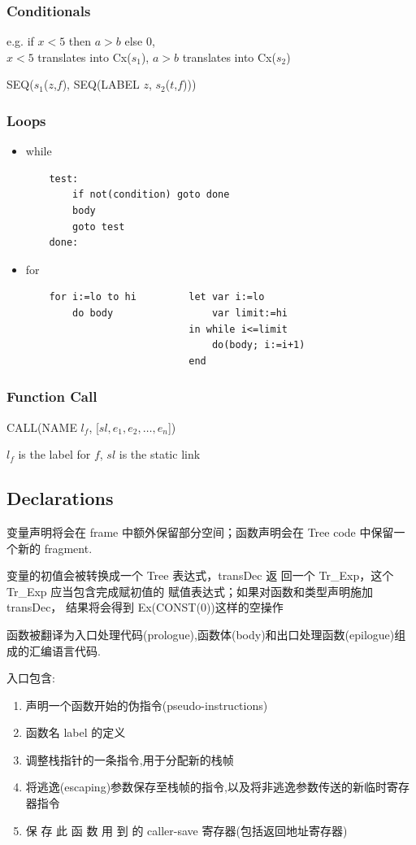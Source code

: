 \subsubsection{Conditionals}
e.g. if $x<5$ then $a>b$ else 0, \\
$x<5$ translates into Cx($s_1$), $a>b$ translates into Cx($s_2$)

SEQ($s_1$($z$,$f$), SEQ(LABEL $z$, $s_2$($t$,$f$)))

\subsubsection{Loops}
\begin{itemize}
    \item while
    \begin{verbatim}
    test:
        if not(condition) goto done
        body
        goto test
    done:
    \end{verbatim}
    
    \item for
    \begin{verbatim}
    for i:=lo to hi         let var i:=lo
        do body                 var limit:=hi
                            in while i<=limit
                                do(body; i:=i+1)
                            end
    \end{verbatim}
    
\end{itemize}
\subsubsection{Function Call}
CALL(NAME $l_f$, [$sl, e_1, e_2,\dots, e_n$])

$l_f$ is the label for $f$, $sl$ is the static link

\subsection{Declarations}
变量声明将会在 frame 中额外保留部分空间；函数声明会在 Tree code 中保留一个新的 fragment.

变量的初值会被转换成一个 Tree 表达式，transDec 返
回一个 Tr\_Exp，这个 Tr\_Exp 应当包含完成赋初值的
赋值表达式；如果对函数和类型声明施加 transDec，
结果将会得到 Ex(CONST(0))这样的空操作

函数被翻译为入口处理代码(prologue),函数体(body)和出口处理函数(epilogue)组成的汇编语言代码.

入口包含:
\begin{enumerate}
    \item 声明一个函数开始的伪指令(pseudo-instructions)
    \item 函数名 label 的定义
    \item 调整栈指针的一条指令,用于分配新的栈帧
    \item 将逃逸(escaping)参数保存至栈帧的指令,以及将非逃逸参数传送的新临时寄存器指令
    \item 保 存  此 函 数 用 到 的 caller-save 寄存器(包括返回地址寄存器)
\end{enumerate}

